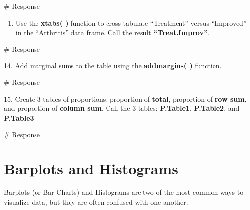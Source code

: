 \documentclass[
  letterpaper,
  DIV=11,
  numbers=noendperiod]{scrreprt}
\newenvironment{Shaded}{\begin{snugshade}}{\end{snugshade}}
\newcommand{\CommentTok}[1]{\textcolor[rgb]{0.37,0.37,0.37}{#1}}
\providecommand{\tightlist}{%
  \setlength{\itemsep}{0pt}\setlength{\parskip}{0pt}}\usepackage{longtable,booktabs,array}
\begin{document}
\begin{Shaded}
\begin{Highlighting}[]
\CommentTok{\# Response}
\end{Highlighting}
\end{Shaded}

\begin{enumerate}
\def\labelenumi{\arabic{enumi}.}
\setcounter{enumi}{12}
\tightlist
\item
  Use the \textbf{xtabs( )} function to cross-tabulate ``Treatment''
  versus ``Improved'' in the ``Arthritis'' data frame. Call the result
  \textbf{``Treat.Improv''}.
\end{enumerate}

\begin{Shaded}
\begin{Highlighting}[]
\CommentTok{\# Response}
\end{Highlighting}
\end{Shaded}

14. Add marginal sums to the table using the \textbf{addmargins( )}
function.

\begin{Shaded}
\begin{Highlighting}[]
\CommentTok{\# Response}
\end{Highlighting}
\end{Shaded}

15. Create 3 tables of proportions: proportion of \textbf{total},
proportion of \textbf{row sum}, and proportion of \textbf{column sum}.
Call the 3 tables: \textbf{P.Table1}, \textbf{P.Table2}, and
\textbf{P.Table3}

\begin{Shaded}
\begin{Highlighting}[]
\CommentTok{\# Response}
\end{Highlighting}
\end{Shaded}


\chapter*{Barplots and Histograms}\label{barplots-and-histograms}


Barplots (or Bar Charts) and Histograms are two of the most common ways
to visualize data, but they are often confused with one another.
\end{document}
